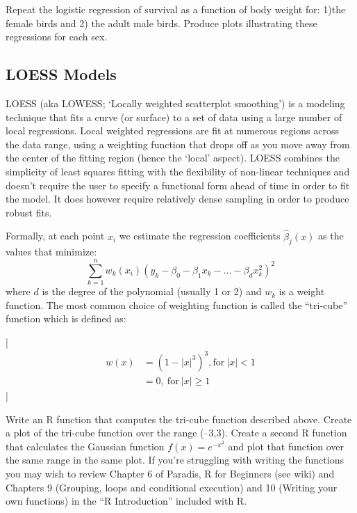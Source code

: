\medskip
\begin{assignment}
Repeat the logistic regression of survival as a
function of body weight for: 1)the female birds and 2) the adult male
birds. Produce plots illustrating these regressions for each sex.
\end{assignment}

\subsection{LOESS Models}

LOESS (aka LOWESS; `Locally weighted scatterplot smoothing') is a
modeling technique that fits a curve (or surface) to a set of data using
a large number of local regressions. Local weighted regressions are fit
at numerous regions across the data range, using a weighting function
that drops off as you move away from the center of the fitting region
(hence the `local' aspect). LOESS combines the simplicity of least
squares fitting with the flexibility of non-linear techniques and
doesn't require the user to specify a functional form ahead of time in
order to fit the model. It does however require relatively dense
sampling in order to produce robust fits.

Formally, at each point $x_i$ we estimate the regression coefficients
$\hat{\beta}_j(x)$ as the values that minimize:
\[\sum_{k=1}^n w_k(x_i)(y_k - \beta_0 - \beta_1 x_k - \ldots - \beta_d x_k^2)^2\]
where $d$ is the degree of the polynomial (usually 1 or 2) and $w_k$ is
a weight function. The most common choice of weighting function is
called the ``tri-cube'' function which is defined as:

\lstDeleteShortInline|
\begin{align*}
 w(x) & = (1-|x|^3)^3, \mbox{for}\ |x| < 1  \\
      & = 0,\ \mbox{for}\ |x| \geq 1 
\end{align*}
\lstMakeShortInline|


\medskip
\begin{assignment}
Write an R function that computes the tri-cube
function described above. Create a plot of the tri-cube function over
the range (--3,3). Create a second R function that calculates the
Gaussian function $f(x) = e^{-x^2}$ and plot that function over the same
range in the same plot. If you're struggling with writing the functions
you may wish to review Chapter 6 of Paradis, R for Beginners (see wiki)
and Chapters 9 (Grouping, loops and conditional execution) and 10
(Writing your own functions) in the ``R Introduction'' included with R.
\end{assignment}


